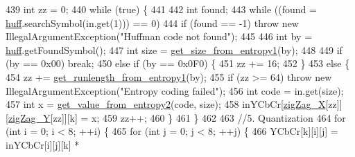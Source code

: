 \begin{DoxyCode}
439                     \textcolor{keywordtype}{int} zz = 0;
440                     \textcolor{keywordflow}{while} (\textcolor{keyword}{true}) \{
441 
442                         \textcolor{keywordtype}{int} found;
443                         \textcolor{keywordflow}{while} ((found = \hyperlink{classdomini_1_1algorithm_1_1JPEG_aacc6445baa7819e3f9139ffb78e0b8f4}{huff}.searchSymbol(in.get(1))) == 0)
444                         \textcolor{keywordflow}{if} (found == -1) \textcolor{keywordflow}{throw} \textcolor{keyword}{new} IllegalArgumentException(\textcolor{stringliteral}{"Huffman code not found"});
445                         
446                         \textcolor{keywordtype}{int} by = \hyperlink{classdomini_1_1algorithm_1_1JPEG_aacc6445baa7819e3f9139ffb78e0b8f4}{huff}.getFoundSymbol();
447                         \textcolor{keywordtype}{int} size = \hyperlink{classdomini_1_1algorithm_1_1JPEG_a8d1005fb7833d36a064afb1c5e15bbd3}{get\_size\_from\_entropy1}(by);
448 
449                         \textcolor{keywordflow}{if} (by == 0x00) \textcolor{keywordflow}{break};
450                         \textcolor{keywordflow}{else} \textcolor{keywordflow}{if} (by == 0x0F0) \{
451                             zz += 16;
452                         \}
453                         \textcolor{keywordflow}{else} \{
454                             zz += \hyperlink{classdomini_1_1algorithm_1_1JPEG_ac58cb434a7acfd90fc8e548fd7c00ae2}{get\_runlength\_from\_entropy1}(by);
455                             \textcolor{keywordflow}{if} (zz >= 64) \textcolor{keywordflow}{throw} \textcolor{keyword}{new} IllegalArgumentException(\textcolor{stringliteral}{"Entropy coding failed"});
456                             \textcolor{keywordtype}{int} code = in.get(size);
457                             \textcolor{keywordtype}{int} x = \hyperlink{classdomini_1_1algorithm_1_1JPEG_a41c69fe2e29999dd17a555859df22530}{get\_value\_from\_entropy2}(code, size);
458                             inYCbCr[\hyperlink{classdomini_1_1algorithm_1_1JPEG_a7d3829cbffd758c087341a8da13dd2ca}{zigZag\_X}[zz]][\hyperlink{classdomini_1_1algorithm_1_1JPEG_ad886d8aa00a40cb151b446534f0d1bcc}{zigZag\_Y}[zz]][k] = x;
459                             zz++;
460                         \}
461                     \}
462 
463                     \textcolor{comment}{//5. Quantization}
464                     \textcolor{keywordflow}{for} (\textcolor{keywordtype}{int} i = 0; i < 8; ++i) \{
465                         \textcolor{keywordflow}{for} (\textcolor{keywordtype}{int} j = 0; j < 8; ++j) \{
466                             YCbCr[k][i][j] = inYCbCr[i][j][k] * 

\end{DoxyCode}
